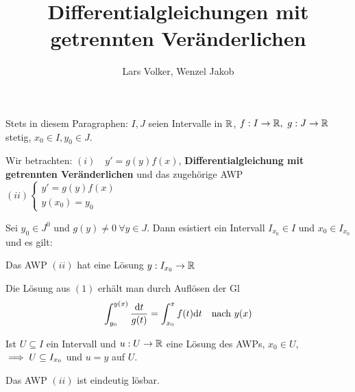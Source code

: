 \documentclass{article}
\title{Differentialgleichungen mit getrennten Veränderlichen}
\author{Lars Volker, Wenzel Jakob}
\begin{document}
\maketitle


Stets in diesem Paragraphen: $I, J$ seien Intervalle in $\mathbb{R}$, $f:I\to\mathbb{R},\ g:J\to\mathbb{R}$ stetig, $x_0\in I, y_0\in J$.

Wir betrachten: $(i)\quad y'=g(y)f(x)$, \textbf{Differentialgleichung mit getrennten Veränderlichen} und das zugehörige AWP $(ii) \begin{cases}y'=g(y)f(x)\\y(x_0)=y_0 \end{cases}$

\begin{satz}
Sei $y_0\in J^0$ und $g(y)\ne 0\ \forall y\in J$. Dann esistiert ein Intervall $I_{x_0}\in I$ und $x_0 \in I_{x_0}$ und es gilt:

\begin{liste}
\item Das AWP $(ii)$ hat eine Lösung $y:I_{x_0}\to\mathbb{R}$
\item Die Lösung aus $(1)$ erhält man durch Auflösen der Gl $$\int_{y_0}^{y(x)} \frac{\mathrm{d} t}{g(t)} = \int_{x_0}^{x} f(t) \mathrm{d} t \text{\quad nach } y(x) $$ 
\item Ist $U\subseteq I$ ein Intervall und $u:U\to \mathbb{R}$ eine Lösung des AWPs, $x_0 \in U$, $\implies U\subseteq I_{x_0}$ und $u=y$ auf $U$.
\item Das AWP $(ii)$ ist eindeutig lösbar.
\end{liste}
\end{satz}
\end{document}
